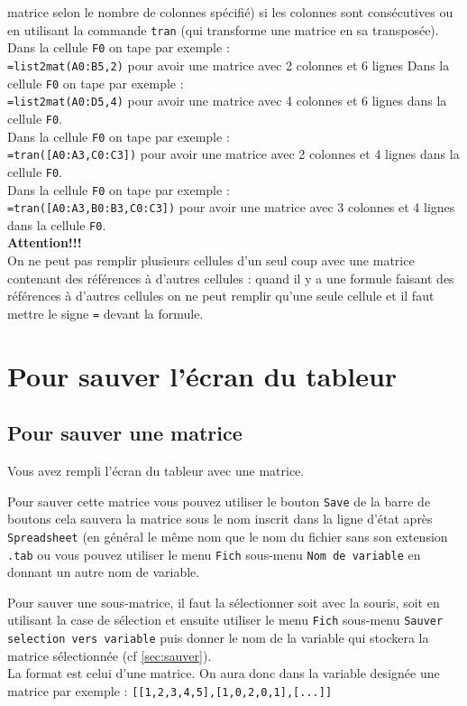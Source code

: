 \documentclass[a4paper,11pt]{book}
\begin{document}
matrice selon le nombre de colonnes sp\'ecifi\'e) si les colonnes sont 
cons\'ecutives ou en utilisant la commande 
{\tt tran} (qui transforme une matrice en sa transpos\'ee).\\
Dans la  cellule {\tt F0} on tape par exemple :\\
 {\tt =list2mat(A0:B5,2)} pour avoir une matrice avec 2 colonnes et 6 lignes
Dans la  cellule {\tt F0} on tape par exemple :\\
{\tt =list2mat(A0:D5,4)} pour avoir une matrice avec 4 colonnes et 6 
lignes dans la  cellule {\tt F0}.\\
Dans la  cellule {\tt F0} on tape par exemple :\\
 {\tt =tran([A0:A3,C0:C3])} pour avoir une matrice avec 2 colonnes et 4
lignes dans la  cellule {\tt F0}.\\
Dans la  cellule {\tt F0} on tape par exemple :\\
 {\tt =tran([A0:A3,B0:B3,C0:C3])} pour avoir une matrice avec 3 colonnes et 4
lignes dans la  cellule {\tt F0}.\\
{\bf Attention!!!} \\
On ne peut pas remplir plusieurs cellules d'un seul coup avec une matrice
contenant des r\'ef\'erences \`a d'autres cellules : quand il y a une formule
 faisant des r\'ef\'erences \`a d'autres cellules on ne peut remplir qu'une 
seule cellule et il faut mettre le signe {\tt =} devant la formule.
\section{Pour sauver l'\'ecran du tableur}
\subsection{Pour sauver une matrice}
Vous avez rempli l'\'ecran du tableur avec une matrice.

Pour sauver cette matrice vous pouvez utiliser le bouton {\tt Save} de la barre
de boutons cela sauvera la matrice sous le nom inscrit dans la ligne d'\'etat 
apr\`es {\tt Spreadsheet} (en g\'en\'eral le m\^eme nom que le nom du fichier 
sans son extension {\tt .tab} ou vous pouvez utiliser le menu {\tt Fich} 
sous-menu {\tt Nom de variable} en donnant un autre nom de variable.

Pour sauver une sous-matrice, il faut la s\'electionner soit avec la souris, 
soit en utilisant la case de s\'election et ensuite 
utiliser le menu {\tt Fich} sous-menu  {\tt Sauver selection vers variable} 
puis donner le nom de la variable qui stockera la matrice s\'electionn\'ee 
(cf \ref{sec:sauver}).\\
La format est celui d'une matrice. On aura donc dans la variable design\'ee
 une matrice par exemple : {\tt [[1,2,3,4,5],[1,0,2,0,1],[...]]}
\end{document}
